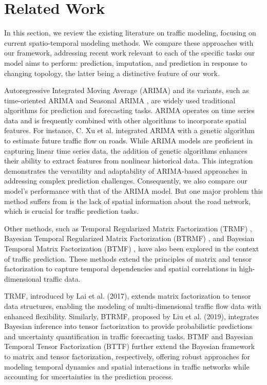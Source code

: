 \section{Related Work}\label{sec:related-works}

In this section, we review the existing literature on traffic modeling, focusing on current spatio-temporal modeling methods. We compare these approaches with our framework, addressing recent work relevant to each of the specific tasks our model aims to perform: prediction, imputation, and prediction in response to changing topology, the latter being a distinctive feature of our work.

Autoregressive Integrated Moving Average (ARIMA) \cite{arima} and its variants, such as time-oriented ARIMA \cite{time_arima} and Seasonal ARIMA \cite{sarima}, are widely used traditional algorithms for prediction and forecasting tasks. ARIMA operates on time series data and is frequently combined with other algorithms to incorporate spatial features. For instance, C. Xu et al. \cite{Xu2016} integrated ARIMA with a genetic algorithm to estimate future traffic flow on roads. While ARIMA models are proficient in capturing linear time series data, the addition of genetic algorithms enhances their ability to extract features from nonlinear historical data. This integration demonstrates the versatility and adaptability of ARIMA-based approaches in addressing complex prediction challenges. Consequently, we also compare our model's performance with that of the ARIMA model. But one major problem this method suffers from is the lack of spatial information about the road network, which is crucial for traffic prediction tasks.

Other methods, such as Temporal Regularized Matrix Factorization (TRMF) \cite{trmf}, Bayesian Temporal Regularized Matrix Factorization (BTRMF) \cite{btrmf}, and Bayesian Temporal Matrix Factorization (BTMF) \cite{btrmf}, have also been explored in the context of traffic prediction. These methods extend the principles of matrix and tensor factorization to capture temporal dependencies and spatial correlations in high-dimensional traffic data.

TRMF, introduced by Lai et al. (2017), extends matrix factorization to tensor data structures, enabling the modeling of multi-dimensional traffic flow data with enhanced flexibility. Similarly, BTRMF, proposed by Liu et al. (2019), integrates Bayesian inference into tensor factorization to provide probabilistic predictions and uncertainty quantification in traffic forecasting tasks. BTMF and Bayesian Temporal Tensor Factorization (BTTF) further extend the Bayesian framework to matrix and tensor factorization, respectively, offering robust approaches for modeling temporal dynamics and spatial interactions in traffic networks while accounting for uncertainties in the prediction process.


